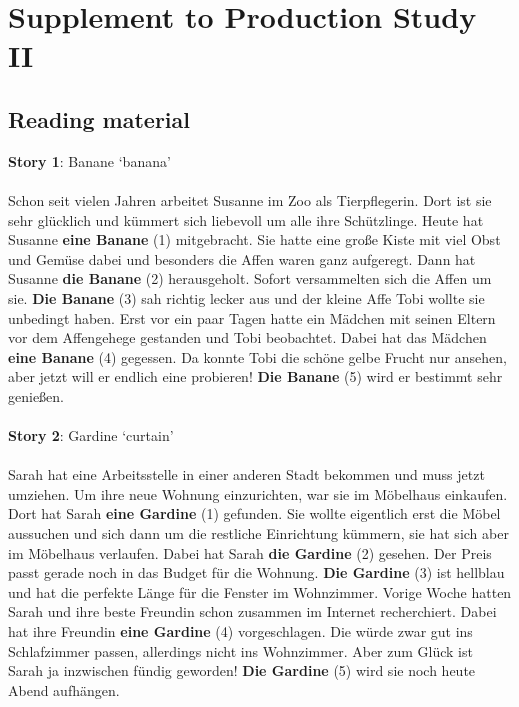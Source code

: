 \chapter{Supplement to Production Study II} 
\label{Appendix B}

\section{Reading material}

\textbf{Story 1}: Banane `banana'\\
\\
Schon seit vielen Jahren arbeitet Susanne im Zoo als Tierpflegerin. Dort ist sie sehr glücklich und kümmert sich liebevoll um alle ihre Schützlinge. Heute hat Susanne \textbf{eine Banane} (1) mitgebracht. Sie hatte eine große Kiste mit viel Obst und Gemüse dabei und besonders die Affen waren ganz aufgeregt. Dann hat Susanne \textbf{die Banane} (2) herausgeholt. Sofort versammelten sich die Affen um sie. \textbf{Die Banane} (3) sah richtig lecker aus und der kleine Affe Tobi wollte sie unbedingt haben. Erst vor ein paar Tagen hatte ein Mädchen mit seinen Eltern vor dem Affengehege gestanden und Tobi beobachtet. Dabei hat das Mädchen \textbf{eine Banane} (4) gegessen. Da konnte Tobi die schöne gelbe Frucht nur ansehen, aber jetzt will er endlich eine probieren! \textbf{Die Banane} (5) wird er bestimmt sehr genießen.\\
\\
\textbf{Story 2}: Gardine `curtain'\\
\\
Sarah hat eine Arbeitsstelle in einer anderen Stadt bekommen und muss jetzt umziehen. Um ihre neue Wohnung einzurichten, war sie im Möbelhaus einkaufen. Dort hat Sarah \textbf{eine Gardine} (1) gefunden. Sie wollte eigentlich erst die Möbel aussuchen und sich dann um die restliche Einrichtung kümmern, sie hat sich aber im Möbelhaus verlaufen. Dabei hat Sarah \textbf{die Gardine} (2) gesehen. Der Preis passt gerade noch in das Budget für die Wohnung. \textbf{Die Gardine} (3) ist hellblau und hat die perfekte Länge für die Fenster im Wohnzimmer. Vorige Woche hatten Sarah und ihre beste Freundin schon zusammen im Internet recherchiert. Dabei hat ihre Freundin \textbf{eine Gardine} (4) vorgeschlagen. Die würde zwar gut ins Schlafzimmer passen, allerdings nicht ins Wohnzimmer. Aber zum Glück ist Sarah ja inzwischen fündig geworden! \textbf{Die Gardine} (5) wird sie noch heute Abend aufhängen.\\
\\
